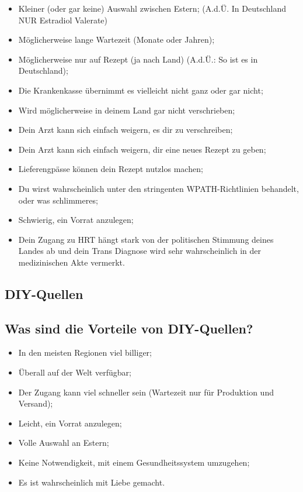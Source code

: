 \documentclass{article}
\begin{document}
{\begin{itemize}
  \item Kleiner (oder gar keine) Auswahl zwischen Estern; (A.d.Ü. In Deutschland NUR Estradiol Valerate)
  \item Möglicherweise lange Wartezeit (Monate oder Jahren);
  \item Möglicherweise nur auf Rezept (ja nach Land) (A.d.Ü.: So ist es in Deutschland);
  \item Die Krankenkasse übernimmt es vielleicht nicht ganz oder gar nicht;
  \item Wird möglicherweise in deinem Land gar nicht verschrieben;
  \item Dein Arzt kann sich einfach weigern, es dir zu verschreiben;
  \item Dein Arzt kann sich einfach weigern, dir eine neues Rezept zu geben;
  \item Lieferengpässe können dein Rezept nutzlos machen;
  \item Du wirst wahrscheinlich unter den stringenten WPATH-Richtlinien behandelt, oder was schlimmeres;
  \item Schwierig, ein Vorrat anzulegen;
  \item Dein Zugang zu HRT hängt stark von der politischen Stimmung deines Landes ab und dein Trans Diagnose wird sehr wahrscheinlich in der medizinischen Akte vermerkt. 
\end{itemize}

\subsection*{DIY-Quellen}

\subsection{Was sind die Vorteile von DIY-Quellen?}

\begin{itemize}
\item In den meisten Regionen viel billiger;
\item Überall auf der Welt verfügbar;
\item Der Zugang kann viel schneller sein (Wartezeit nur für Produktion und Versand);
\item Leicht, ein Vorrat anzulegen;
\item Volle Auswahl an Estern;
\item Keine Notwendigkeit, mit einem Gesundheitssystem umzugehen;
\item Es ist wahrscheinlich mit Liebe gemacht.
\end{itemize}

}
\end{document}
